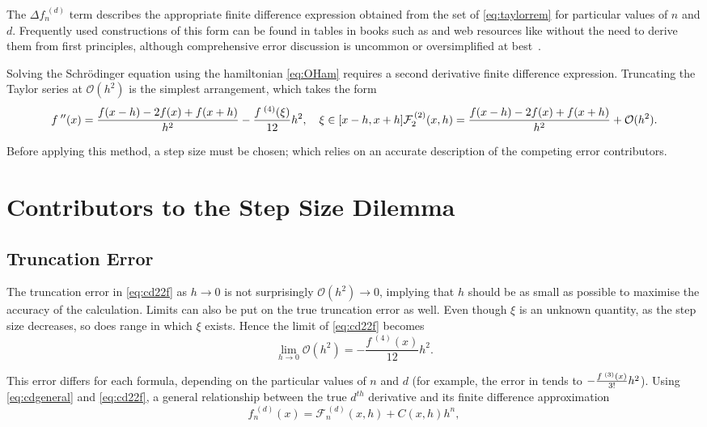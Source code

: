 The $\Delta f_n^{\;(d)}$ term describes the appropriate finite difference expression obtained from the set of \cref{eq:taylorrem} for particular values of $n$ and $d$.
Frequently used constructions of this form can be found in tables in books such as \citeauthor{Mathews2004} and web resources like \citeauthor{Holoborodko2009} without the need to derive them from first principles, although comprehensive error discussion is uncommon or oversimplified at best~\cite{Mathews2004,Holoborodko2009}.

Solving the Schr\"{o}dinger equation using the hamiltonian \cref{eq:OHam} requires a second derivative finite difference expression.
Truncating the Taylor series at $\mathcal{O}(h^2)$ is the simplest arrangement, which takes the form
\begin{equation}
f^{\;\prime\prime}(x) = \frac{f(x-h)-2f(x)+f(x+h)}{h^2} - \frac{f^{\;(4)}(\xi)}{12}h^2, \quad \xi \in [x-h,x+h]\label{eq:cd22t} \\
\mathcal{F}_2^{\,(2)}(x,h) = \frac{f(x-h)-2f(x)+f(x+h)}{h^2} + \mathcal{O}(h^2).\label{eq:cd22f}
\end{equation}

Before applying this method, a step size must be chosen; which relies on an accurate description of the competing error contributors.

\section{Contributors to the Step Size Dilemma}

\subsection{Truncation Error}\label{sec:truncerr}

The truncation error in \cref{eq:cd22f} as $h\!\to\!0$ is not surprisingly $\mathcal{O}(h^2)\!\to\!0$, implying that $h$ should be as small as possible to maximise the accuracy of the calculation.
Limits can also be put on the true truncation error as well.
Even though $\xi$ is an unknown quantity, as the step size decreases, so does range in which $\xi$ exists.
Hence the limit of \cref{eq:cd22f} becomes
\begin{equation}
\lim_{h \to 0}\mathcal{O}(h^2) =  - \frac{f^{\;(4)}(x)}{12}h^2.
\end{equation}

This error differs for each formula, depending on the particular values of $n$ and $d$ (for example, the error in  tends to $\cramped{-\frac{f^{\;(3)}(x)}{3!}h^2}$).
Using \cref{eq:cdgeneral} and \cref{eq:cd22f}, a general relationship between the true $d^{th}$ derivative and its finite difference approximation
\begin{equation}
 f_n^{\;(d)}(x) = \mathcal{F}_n^{\,(d)}(x,h) + C(x,h)h^n,\label{eq:cdadj}
\end{equation}

